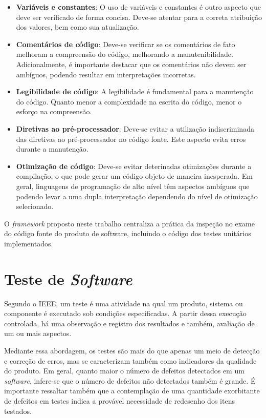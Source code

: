 \begin{itemize}
	\item \textbf{Variáveis e constantes}: O uso de variáveis e constantes é outro aspecto que deve ser verificado de forma concisa. Deve-se atentar para a correta atribuição dos valores, bem como sua atualização.

	\item \textbf{Comentários de código}: Deve-se verificar se os comentários de fato melhoram a compreensão do código, melhorando a manutenibilidade. Adicionalmente, é importante destacar que os comentários não devem ser ambíguos, podendo resultar em interpretações incorretas.

	\item \textbf{Legibilidade de código}: A legibilidade é fundamental para a manutenção do código. Quanto menor a complexidade na escrita do código, menor o esforço na compreensão.

	\item \textbf{Diretivas ao pré-processador}: Deve-se evitar a utilização indiscriminada das diretivas ao pré-processador no código fonte. Este aspecto evita erros durante a manutenção.

	\item \textbf{Otimização de código}: Deve-se evitar deterinadas otimizações durante a compilação, o que pode gerar um código objeto de maneira inesperada. Em geral, linguagens de programação de alto nível têm aspectos ambíguos que podendo levar a uma dupla interpretação dependendo do nível de otimização selecionado.
\end{itemize}

O \textit{framework} proposto neste trabalho centraliza a prática da inspeção no exame do código fonte do produto de software, incluindo o código dos testes unitários implementados.

\section{Teste de \textit{Software}}

Segundo o IEEE, um teste é uma atividade na qual um produto, sistema ou componente é executado sob condições especificadas. A partir dessa execução controlada, há uma observação e registro dos resultados e também, avaliação de um ou mais aspectos.

Mediante essa abordagem, os testes são mais do que apenas um meio de detecção e correção de erros, mas se caracterizam também como indicadores da qualidade do produto. Em geral, quanto maior o número de defeitos detectados em um \textit{software}, infere-se que o número de defeitos não detectados também é grande. É importante ressaltar também que a contemplação de uma quantidade exorbitante de defeitos em testes indica a provável necessidade de redesenho dos itens testados.

